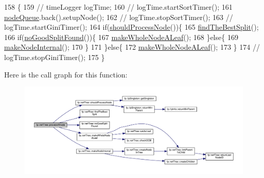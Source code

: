 \begin{DoxyCode}
158                                           \{
159                     \textcolor{comment}{//  timeLogger logTime;}
160                     \textcolor{comment}{//  logTime.startSortTimer();}
161                     \hyperlink{classfp_1_1rerfTree_a59b3bdcba86acbe93fd46658132218a8}{nodeQueue}.back().setupNode();
162                     \textcolor{comment}{//  logTime.stopSortTimer();}
163                     \textcolor{comment}{//  logTime.startGiniTimer();}
164                     \textcolor{keywordflow}{if}(\hyperlink{classfp_1_1rerfTree_ae8c63628698cd29fb24cfecf0c2e302e}{shouldProcessNode}())\{
165                         \hyperlink{classfp_1_1rerfTree_acd1bd04959e0537502a6abbd31bda7da}{findTheBestSplit}();
166                         \textcolor{keywordflow}{if}(\hyperlink{classfp_1_1rerfTree_aa266b3629b914f4ad01d8b1933a85ee2}{noGoodSplitFound}())\{
167                             \hyperlink{classfp_1_1rerfTree_a2cc428162305a46d79268addda902688}{makeWholeNodeALeaf}();
168                         \}\textcolor{keywordflow}{else}\{
169                             \hyperlink{classfp_1_1rerfTree_adc3c8f338accaa401098a63d826390d3}{makeNodeInternal}();
170                         \}
171                     \}\textcolor{keywordflow}{else}\{
172                         \hyperlink{classfp_1_1rerfTree_a2cc428162305a46d79268addda902688}{makeWholeNodeALeaf}();
173                     \}
174                     \textcolor{comment}{//  logTime.stopGiniTimer();}
175                 \}
\end{DoxyCode}
Here is the call graph for this function\+:
\nopagebreak
\begin{figure}[H]
\begin{center}
\leavevmode
\includegraphics[width=350pt]{classfp_1_1rerfTree_a69c175640d930d630504875e60b3b780_cgraph}
\end{center}
\end{figure}
\mbox{\label{classfp_1_1rerfTree_aa8281a45487868e4cf8e3dad9d9be8d3}} 
